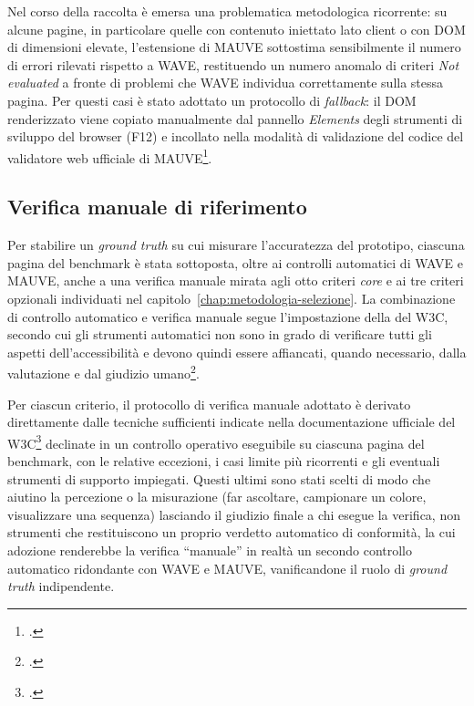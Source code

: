 Nel corso della raccolta è emersa una problematica metodologica ricorrente: su alcune pagine, in particolare quelle con contenuto iniettato lato client o con DOM di dimensioni elevate, l'estensione di MAUVE sottostima sensibilmente il numero di errori rilevati rispetto a WAVE, restituendo un numero anomalo di criteri \emph{Not evaluated} a fronte di problemi che WAVE individua correttamente sulla stessa pagina. Per questi casi è stato adottato un protocollo di \emph{fallback}: il DOM renderizzato viene copiato manualmente dal pannello \emph{Elements} degli strumenti di sviluppo del browser (F12) e incollato nella modalità di validazione del codice del validatore web ufficiale di MAUVE\footcite{mauve:single-validation}.

\subsection{Verifica manuale di riferimento}
\label{sec:verifica-manuale-riferimento}

Per stabilire un \emph{ground truth} su cui misurare l'accuratezza del prototipo, ciascuna pagina del benchmark è stata sottoposta, oltre ai controlli automatici di WAVE e MAUVE, anche a una verifica manuale mirata agli otto criteri \emph{core} e ai tre criteri opzionali individuati nel capitolo~\ref{chap:metodologia-selezione}. La combinazione di controllo automatico e verifica manuale segue l'impostazione della  del W3C, secondo cui gli strumenti automatici non sono in grado di verificare tutti gli aspetti dell'accessibilità e devono quindi essere affiancati, quando necessario, dalla valutazione e dal giudizio umano\footcite[Evaluations tools]{w3c:wcag-em}.

Per ciascun criterio, il protocollo di verifica manuale adottato è derivato direttamente dalle tecniche sufficienti indicate nella documentazione ufficiale del W3C\footcite{w3c:understanding-intro,w3c:quickref} declinate in un controllo operativo eseguibile su ciascuna pagina del benchmark, con le relative eccezioni, i casi limite più ricorrenti e gli eventuali strumenti di supporto impiegati. Questi ultimi sono stati scelti di modo che aiutino la percezione o la misurazione (far ascoltare, campionare un colore, visualizzare una sequenza) lasciando il giudizio finale a chi esegue la verifica, non strumenti che restituiscono un proprio verdetto automatico di conformità, la cui adozione renderebbe la verifica \enquote{manuale} in realtà un secondo controllo automatico ridondante con WAVE e MAUVE, vanificandone il ruolo di \emph{ground truth} indipendente.

